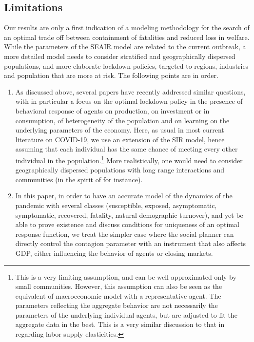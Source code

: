 \documentclass{amsart}
\begin{document}
\subsection{Limitations}

Our results are only a first indication of a modeling methodology for the search of an optimal trade off between containment of fatalities and reduced loss in welfare. While the parameters of the SEAIR model are related to the current outbreak, a more detailed model needs to consider stratified and geographically dispersed populations, and more elaborate lockdown policies, targeted to regions, industries and population that are more at risk. The following points are in order. 
\begin{enumerate}

\item As discussed above,  several papers have recently addressed similar questions, with in particular a focus on the optimal lockdown policy in the presence of behavioral response of agents on production, on investment or in consumption, of heterogeneity of the population and  on learning on the underlying parameters of the economy. 
Here, as usual in most current literature on COVID-19, 
we use an extension of the SIR model, hence assuming 
that each individual has the same chance of meeting
every other individual in the population.\footnote{This is 
a very limiting assumption, and can be well approximated only by small communities.  However, this assumption can also be seen as the equivalent of macroeconomic model with a representative agent. The parameters reflecting the aggregate behavior are not necessarily the parameters of the underlying individual agents, but are adjusted to fit the aggregate data in the best. This is a very similar discussion to that in \cite{keane2012micro} regarding labor supply elasticities.\color{black}} More realistically,
one would need to consider
geographically dispersed populations with long range 
interactions and communities (in the spirit of \cite{gandolfi2016} for instance). 


\item In this paper, in order to have an accurate model of the dynamics of the pandemic with  several classes (susceptible, exposed, asymptomatic, symptomatic, recovered, fatality, natural demographic turnover), and yet be able to prove  existence and discuss conditions for uniqueness of an optimal response function, we treat the simpler case where the social planner can directly control the contagion parameter with an instrument that also affects GDP, either influencing the behavior of agents or closing markets.



\end{enumerate}
\end{document}
